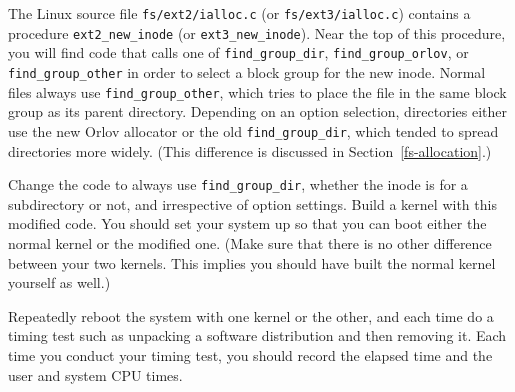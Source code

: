 \begin{chapterEnumerate}
The Linux source file \verb|fs/ext2/ialloc.c| (or
\verb|fs/ext3/ialloc.c|) contains a procedure \verb|ext2_new_inode|
(or
\verb|ext3_new_inode|).  Near the top of this procedure, you will find
code that calls one of \verb|find_group_dir|, \verb|find_group_orlov|,
or \verb|find_group_other| in order to select a block group for the
new inode.  Normal files always use \verb|find_group_other|, which
tries to place the file in the same block group as its parent
directory.  Depending on an option selection, directories either use
the new Orlov allocator or the old \verb|find_group_dir|, which tended
to spread directories more widely.  (This difference is discussed in
Section~\ref{fs-allocation}.)

Change the code to always use \verb|find_group_dir|, whether the inode
is for a subdirectory or not, and irrespective of option settings.
Build a kernel with this modified code.  You should set your system up
so that you can boot either the normal kernel or the modified one.  (Make
sure that there is no other difference between your two kernels.  This
implies you should have built the normal kernel yourself as well.)

Repeatedly reboot the system with one kernel or the other, and each
time do a timing test such as unpacking a software distribution and
then removing it.  Each time you conduct your timing test, you should
record the elapsed time and the user and system CPU times.


\end{chapterEnumerate}
